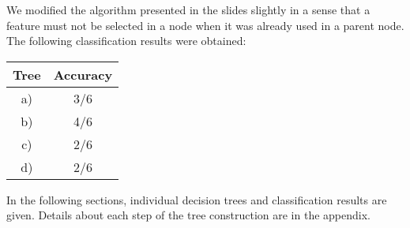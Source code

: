 We modified the algorithm presented in the slides slightly in a sense that
a feature must not be selected in a node when it was already used in a parent node.
The following classification results were obtained:

\begin{center}
  \begin{tabular}{cc}
    \toprule
    Tree & Accuracy\\
    \midrule
    a) & 3/6\\
    b) & 4/6\\
    c) & 2/6\\
    d) & 2/6\\
    \bottomrule
  \end{tabular}
\end{center}

In the following sections, individual decision trees and classification results are given.
Details about each step of the tree construction are in the appendix.


